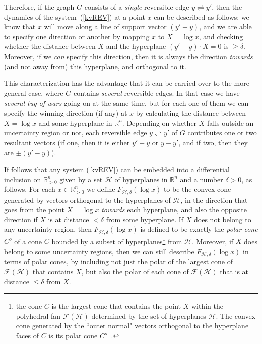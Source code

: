 \documentclass[12pt,letterpaper]{article}
\renewcommand{\H}{\mathcal{H}}
\newcommand{\F}{\mathcal{F}}
\newcommand{\RR}{\mathbb{R}}
\begin{document}
Therefore, if the graph $G$ consists of a {\em single} reversible edge $y\rightleftharpoons y'$, then the dynamics of the system~(\ref{kvREV}) at a point $x$ can be described as follows: we know that $x$ will move along a line of support vector $(y'-y)$, and we are able to specify one direction or another by mapping $x$ to $X=\log x$, and checking whether the distance between $X$ and the hyperplane $(y'-y)\cdot X = 0$ is $\ge \delta$.  Moreover, if we {\em can} specify this direction, then it is always the direction {\em towards} (and not away from) this hyperplane, and orthogonal to it.

This characterization has the advantage that it can be carried over to the more general case, where $G$ contains  {\em several} reversible edges. In that case we have {\em several tug-of-wars} going on at the same time, but for each one of them we can specify the winning direction (if any) at $x$ by calculating the distance between $X=\log x$ and some hyperplane in $\RR^n$. Depending on whether $X$ falls outside an uncertainty region or not, each reversible edge $y\rightleftharpoons y'$ of $G$ contributes one or two resultant vectors (if one, then it is either $y'-y$ or $y-y'$, and if two, then they are $\pm(y'-y)$). 

If follows that any system (\ref{kvREV}) can be embedded into a differential inclusion on $\RR^n_{>0}$ given by a set $\H$ of hyperplanes in $\RR^n$ and a number $\delta>0$, as follows. For each $x\in\RR^n_{>0}$ we define $F_{\H,\delta}(\log x)$ to be the  convex cone generated by vectors orthogonal to the hyperplanes of $\H$, in the direction that goes from the point $X=\log x$ {\em towards} each hyperplane, and also the opposite direction if $X$ is at distance $<\delta$ from some hyperplane. If $X$ does not belong to any uncertainty region, then $F_{\H,\delta}(\log x)$ is defined to be exactly the {\em polar cone} $C^o$ of a cone $C$ bounded by a subset of hyperplanes\footnote{
the cone $C$ is the largest cone that contains the point $X$ within the polyhedral fan $\F(\H)$ determined by the set of hyperplanes $\H$. The convex cone generated by the ``outer normal" vectors orthogonal to the hyperplane faces of $C$ is its polar cone $C^o$~\cite{Fulton}.
} from $\H$. Moreover, if $X$ does belong to some uncertainty regions, then we can still describe $F_{\H,\delta}(\log x)$ in terms of polar cones, by including not just the polar of the largest cone of $\F(\H)$ that contains $X$, but also the polar of each cone of $\F(\H)$ that is at distance $\le \delta$ from $X$.
\end{document}
